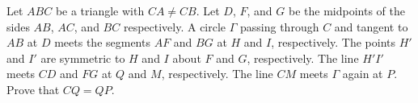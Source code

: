 Let 
$ABC$
 be a triangle with 
$CA \neq CB$.
 Let 
$D$, 
$F$, 
 and 
$G$
 be the midpoints of the sides 
$AB$,
$AC$, 
 and 
$BC$
 respectively. A circle 
$\Gamma$
 passing through 
$C$
 and tangent to 
$AB$
 at 
$D$
 meets the segments 
$AF$
 and 
$BG$
 at 
$H$
 and 
$I$, 
 respectively. The points 
$H'$
 and 
$I'$
 are symmetric to 
$H$
 and 
$I$
 about 
$F$
 and 
$G$, 
 respectively. The line 
$H'I'$
 meets 
$CD$
 and 
$FG$
 at 
$Q$
 and 
$M$, 
 respectively. The line 
$CM$
 meets 
$\Gamma$
 again at 
$P$.
 Prove that 
$CQ = QP$.
